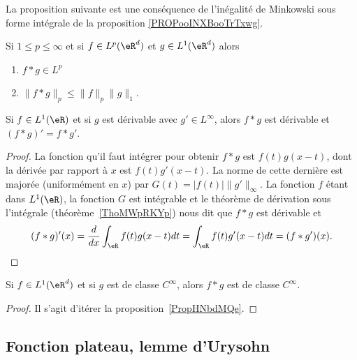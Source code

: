 La proposition suivante est une conséquence de l'inégalité de Minkowski sous forme intégrale de la proposition \ref{PROPooINXBooTrTxwg}.
\begin{proposition}     \label{PROPooDMMCooPTuQuS}
	Si \( 1\leq p\leq \infty\) et si \( f\in L^p(\eR^d)\) et \( g\in L^1(\eR^d)\) alors
	\begin{enumerate}
		\item
		      \( f*g\in L^p\)
		\item
		      \( \| f*g \|_p\leq \| f \|_p\| g \|_1\).
	\end{enumerate}
\end{proposition}

\begin{proposition} \label{PropHNbdMQe}
	Si \( f\in L^1(\eR)\) et si \( g\) est dérivable avec \( g'\in L^{\infty}\), alors \( f*g\) est dérivable et \( (f*g)'=f*g'\).
\end{proposition}

\begin{proof}
	La fonction qu'il faut intégrer pour obtenir \( f*g\) est \( f(t)g(x-t)\), dont la dérivée par rapport à \( x\) est \( f(t)g'(x-t)\). La norme de cette dernière est majorée (uniformément en \( x\)) par \( G(t)=| f(t) | \| g' \|_{\infty}\). La fonction \( f\) étant dans \( L^1(\eR)\), la fonction \( G\) est intégrable et le théorème de dérivation sous l'intégrale (théorème~\ref{ThoMWpRKYp}) nous dit que \( f*g\) est dérivable et
	\begin{equation}
		(f*g)'(x)=\frac{ d }{ dx }\int_{\eR}f(t)g(x-t)dt=\int_{\eR}f(t)g'(x-t)dt=(f*g')(x).
	\end{equation}
\end{proof}

\begin{corollary}       \label{CORooBSPNooFwYQrc}
	Si \( f\in L^1(\eR^d)\) et si \( g\) est de classe \(  C^{\infty}\), alors \( f*g\) est de classe \(  C^{\infty}\).
\end{corollary}

\begin{proof}
	Il s'agit d'itérer la proposition~\ref{PropHNbdMQe}.
\end{proof}

\subsection{Fonction plateau, lemme d'Urysohn}




